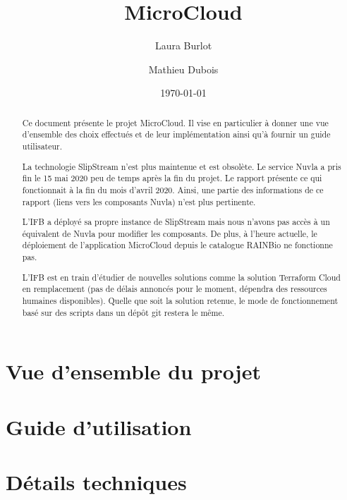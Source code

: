 \documentclass[a4paper]{report}
\title{MicroCloud}
\author{Laura Burlot \and Mathieu Dubois}
\date{\today}
\begin{document}
\maketitle
\sloppy
\newpage

\tableofcontents
\newpage

\listoftodos

\begin{abstract}
Ce document présente le projet MicroCloud.
Il vise en particulier à donner une vue d'ensemble des choix effectués
et de leur implémentation ainsi qu'à fournir un guide utilisateur.

\begin{mycolorbox}
    La technologie SlipStream n'est plus maintenue et est obsolète.
    Le service Nuvla a pris fin le 15 mai 2020 peu de temps après la fin du projet.
    Le rapport présente ce qui fonctionnait à la fin du mois d'avril 2020.
    Ainsi, une partie des informations de ce rapport (liens vers les composants Nuvla) n'est plus pertinente.

    L'IFB a déployé sa propre instance de SlipStream mais nous n'avons pas accès à un équivalent de Nuvla pour modifier les composants.
    De plus, à l'heure actuelle, le déploiement de l'application MicroCloud depuis le catalogue RAINBio ne fonctionne pas.

    L'IFB est en train d'étudier de nouvelles solutions comme la solution Terraform Cloud en remplacement (pas de délais annoncés pour le moment, dépendra des ressources humaines disponibles). Quelle que soit la solution retenue, le mode de fonctionnement basé sur des scripts dans un dépôt git restera le même.
\end{mycolorbox}
\end{abstract}

\part{Vue d'ensemble du projet}







\part{Guide d'utilisation}





\part{Détails techniques}




\end{document}
